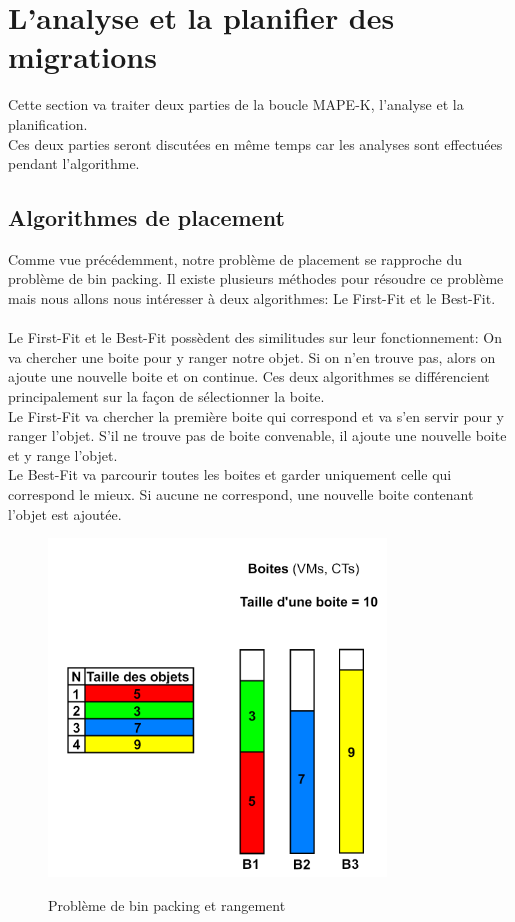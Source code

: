 \documentclass[14pt]{extarticle}
\begin{document}
\section{L'analyse et la planifier des migrations}
    Cette section va traiter deux parties de la boucle MAPE-K, l'analyse et la planification.\\
    Ces deux parties seront discutées en même temps car les analyses sont effectuées pendant l'algorithme.\\

    \subsection{Algorithmes de placement}
    Comme vue précédemment, notre problème de placement se rapproche du problème de bin packing. Il existe plusieurs méthodes pour résoudre ce problème mais nous allons nous intéresser à deux algorithmes: Le First-Fit et le Best-Fit.\\
    \\
    Le First-Fit et le Best-Fit possèdent des similitudes sur leur fonctionnement: On va chercher une boite pour y ranger notre objet. Si on n'en trouve pas, alors on ajoute une nouvelle boite et on continue. Ces deux algorithmes se différencient principalement sur la façon de sélectionner la boite.\\
    Le First-Fit va chercher la première boite qui correspond et va s'en servir pour y ranger l'objet. S'il ne trouve pas de boite convenable, il ajoute une nouvelle boite et y range l'objet.\\
    Le Best-Fit va parcourir toutes les boites et garder uniquement celle qui correspond le mieux. Si aucune ne correspond, une nouvelle boite contenant l'objet est ajoutée.
    \newpage
    \begin{figure}[!h]
        \centering
        \includegraphics[width=0.8\textwidth]{img/bin_packing.png}
        \label{Problème de bin packing et rangement}
        \caption{Problème de bin packing et rangement}
    \end{figure}
\end{document}
